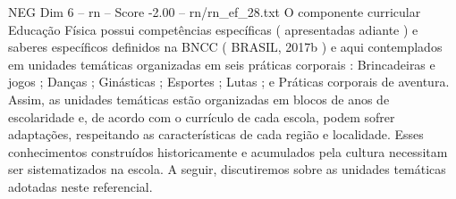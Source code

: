 \begin{textsample}{NEG Dim 6 – rn – Score -2.00 – rn/rn\_ef\_28.txt}
O componente curricular Educação Física possui competências específicas ( apresentadas adiante ) e saberes específicos definidos na BNCC ( BRASIL, 2017b ) e aqui contemplados em unidades temáticas organizadas em seis práticas corporais : Brincadeiras e jogos ; Danças ; Ginásticas ; Esportes ; Lutas ; e Práticas corporais de aventura.
Assim, as unidades temáticas estão organizadas em blocos de anos de escolaridade e, de acordo com o currículo de cada escola, podem sofrer adaptações, respeitando as características de cada região e localidade.
Esses conhecimentos construídos historicamente e acumulados pela cultura necessitam ser sistematizados na escola.
A seguir, discutiremos sobre as unidades temáticas adotadas neste referencial.

\end{textsample}
